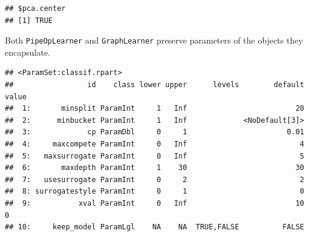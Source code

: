\documentclass[]{scrbook}
\newenvironment{Shaded}{\begin{snugshade}}{\end{snugshade}}
\newcommand{\KeywordTok}[1]{\textcolor[rgb]{0.13,0.29,0.53}{\textbf{#1}}}
\newcommand{\NormalTok}[1]{#1}
\newcommand{\OperatorTok}[1]{\textcolor[rgb]{0.81,0.36,0.00}{\textbf{#1}}}
\newcommand{\StringTok}[1]{\textcolor[rgb]{0.31,0.60,0.02}{#1}}
\renewenvironment{Shaded} {\begin{snugshade}\small} {\end{snugshade}}
\begin{document}
\begin{Shaded}
\end{Shaded}

\begin{verbatim}
## $pca.center
## [1] TRUE
\end{verbatim}

Both \texttt{PipeOpLearner} and \texttt{GraphLearner} preserve parameters of the objects they encapsulate.

\begin{Shaded}
\end{Shaded}

\begin{verbatim}
## <ParamSet:classif.rpart>
##                 id    class lower upper      levels        default value
##  1:       minsplit ParamInt     1   Inf                         20      
##  2:      minbucket ParamInt     1   Inf             <NoDefault[3]>      
##  3:             cp ParamDbl     0     1                       0.01      
##  4:     maxcompete ParamInt     0   Inf                          4      
##  5:   maxsurrogate ParamInt     0   Inf                          5      
##  6:       maxdepth ParamInt     1    30                         30      
##  7:   usesurrogate ParamInt     0     2                          2      
##  8: surrogatestyle ParamInt     0     1                          0      
##  9:           xval ParamInt     0   Inf                         10     0
## 10:     keep_model ParamLgl    NA    NA  TRUE,FALSE          FALSE
\end{verbatim}

\begin{Shaded}
\end{Shaded}
\end{document}
